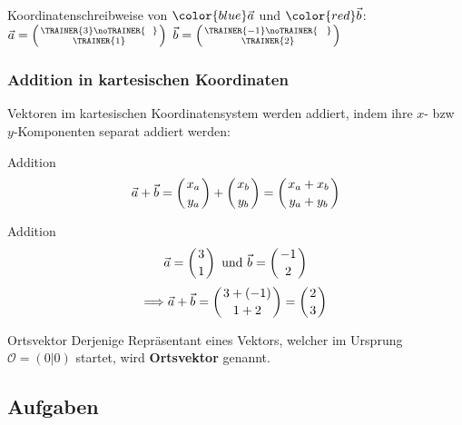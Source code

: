 Koordinatenschreibweise von $\color{blue}\vec{a}$ und $\color{red}\vec{b}$:\,\,
$\vec{a} = \left( \TRAINER{3}\noTRAINER{\,\,\,\,} \atop \TRAINER{1} \right)$
$\vec{b} = \left( \TRAINER{-1}\noTRAINER{\,\,\,\,\,} \atop \TRAINER{2} \right)$
\newpage
\subsubsection{Addition in kartesischen Koordinaten}
Vektoren im kartesischen Koordinatensystem werden addiert, indem ihre
$x$- bzw $y$-Komponenten separat addiert werden:

\begin{gesetz}{Addition}{}
$$\vec{a} + \vec{b} =   \left(x_a \atop y_a \right)  + \left( x_b \atop y_b \right) =
  \left( x_a + x_b \atop y_a + y_b \right)$$
  \end{gesetz}

\begin{beispiel}{Addition}{}
  $$\vec{a} = \left(3\atop 1\right) \text{ und } \vec{b} = \left(-1
  \atop 2\right)$$
  $$\Longrightarrow \vec{a} + \vec{b} = \left(3 + (-1) \atop 1 +
  2\right) = \left(2 \atop 3\right)$$
  \end{beispiel}

\begin{definition}{Ortsvektor}{}
  Derjenige Repräsentant eines Vektors, welcher im Ursprung $\mathcal{O} = (0|0)$
  startet, wird \textbf{Ortsvektor} genannt.
\end{definition}




\subsection*{Aufgaben}    
\newpage



\newpage

